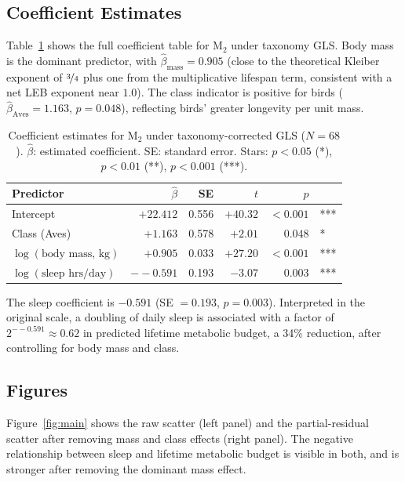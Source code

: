 \documentclass{article}
\begin{document}
\subsection{Coefficient Estimates}

Table~\ref{tab:coefficients} shows the full coefficient table for M$_2$ under taxonomy
GLS. Body mass is the dominant predictor, with $\hat\beta_{\text{mass}} = 0.905$
(close to the theoretical Kleiber exponent of $\nicefrac{3}{4}$ plus one from the
multiplicative lifespan term, consistent with a net LEB exponent near $1.0$). The
class indicator is positive for birds ($\hat\beta_{\text{Aves}} = 1.163$, $p = 0.048$),
reflecting birds' greater longevity per unit mass.

\begin{table}[t]
  \caption{Coefficient estimates for M$_2$ under taxonomy-corrected GLS ($N = 68$).
    $\hat\beta$: estimated coefficient. SE: standard error. Stars: $p < 0.05$ (*),
    $p < 0.01$ (**), $p < 0.001$ (***).}
  \label{tab:coefficients}
  \centering
  \small
  \begin{tabular}{lrrrrl}
    \toprule
    Predictor & $\hat\beta$ & SE & $t$ & $p$ & \\
    \midrule
    Intercept          & $+22.412$ & 0.556 & $+40.32$ & $<0.001$ & *** \\
    Class (Aves)       & $+1.163$  & 0.578 & $+2.01$  & $0.048$  & *   \\
    $\log(\text{body mass, kg})$ & $+0.905$ & 0.033 & $+27.20$ & $<0.001$ & *** \\
    $\log(\text{sleep hrs/day})$ & $--0.591$ & 0.193 & $-3.07$  & $0.003$ & *** \\
    \bottomrule
  \end{tabular}
\end{table}

The sleep coefficient is $-0.591$ (SE $= 0.193$, $p = 0.003$). Interpreted
in the original scale, a doubling of daily sleep is associated with a factor of
$2^{--0.591} \approx 0.62$ in predicted lifetime metabolic budget, a 34\% reduction,
after controlling for body mass and class.

\subsection{Figures}

Figure~\ref{fig:main} shows the raw scatter (left panel) and the partial-residual
scatter after removing mass and class effects (right panel). The negative relationship
between sleep and lifetime metabolic budget is visible in both, and is stronger after
removing the dominant mass effect.
\end{document}
